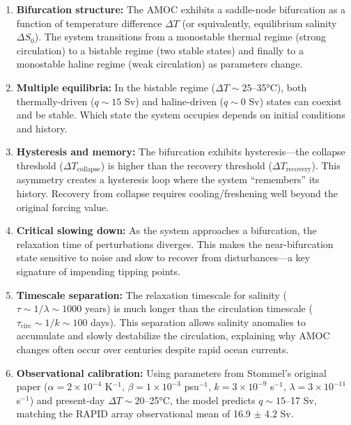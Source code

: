 \documentclass[12pt,letterpaper]{article}
\begin{document}
\begin{enumerate}

\item \textbf{Bifurcation structure:} The AMOC exhibits a saddle-node bifurcation as a function of temperature difference $\Delta T$ (or equivalently, equilibrium salinity $\Delta S_0$). The system transitions from a monostable thermal regime (strong circulation) to a bistable regime (two stable states) and finally to a monostable haline regime (weak circulation) as parameters change.

\item \textbf{Multiple equilibria:} In the bistable regime ($\Delta T \sim 25$--35°C), both thermally-driven ($q \sim 15$ Sv) and haline-driven ($q \sim 0$ Sv) states can coexist and be stable. Which state the system occupies depends on initial conditions and history.

\item \textbf{Hysteresis and memory:} The bifurcation exhibits hysteresis---the collapse threshold ($\Delta T_{\text{collapse}}$) is higher than the recovery threshold ($\Delta T_{\text{recovery}}$). This asymmetry creates a hysteresis loop where the system ``remembers'' its history. Recovery from collapse requires cooling/freshening well beyond the original forcing value.

\item \textbf{Critical slowing down:} As the system approaches a bifurcation, the relaxation time of perturbations diverges. This makes the near-bifurcation state sensitive to noise and slow to recover from disturbances---a key signature of impending tipping points.

\item \textbf{Timescale separation:} The relaxation timescale for salinity ($\tau \sim 1/\lambda \sim 1000$ years) is much longer than the circulation timescale ($\tau_{\text{circ}} \sim 1/k \sim 100$ days). This separation allows salinity anomalies to accumulate and slowly destabilize the circulation, explaining why AMOC changes often occur over centuries despite rapid ocean currents.

\item \textbf{Observational calibration:} Using parameters from Stommel's original paper ($\alpha = 2 \times 10^{-4}$ K$^{-1}$, $\beta = 1 \times 10^{-3}$ psu$^{-1}$, $k = 3 \times 10^{-9}$ s$^{-1}$, $\lambda = 3 \times 10^{-11}$ s$^{-1}$) and present-day $\Delta T \sim 20$--25°C, the model predicts $q \sim 15$--17 Sv, matching the RAPID array observational mean of 16.9 $\pm$ 4.2 Sv.

\end{enumerate}
\end{document}
